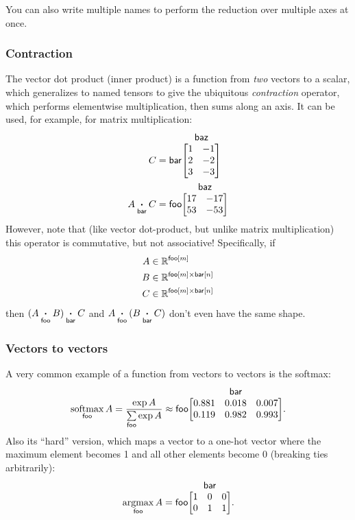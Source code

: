 \documentclass{article}
\makeatletter
\newcommand{\nmatrix}[3]{\name{#1}\begin{array}[b]{@{}c@{}}\name{#2}\\\begin{bmatrix}#3\end{bmatrix}\end{array}}
\makeatother
\begin{document}
You can also write multiple names to perform the reduction over multiple axes at once.

\subsubsection{Contraction}

The vector dot product (inner product) is a function from \emph{two} vectors to a scalar, which generalizes to named tensors to give the ubiquitous \emph{contraction} operator, which performs elementwise multiplication, then sums along an axis. It can be used, for example, for matrix multiplication:
\begin{align*}
C &= \nmatrix{bar}{baz}{
  1 & -1 \\ 2 & -2 \\ 3 & -3
} \\
A \ndot{bar} C &= \nmatrix{foo}{baz}{
  17 & -17 \\
  53 & -53
}
\end{align*}
However, note that (like vector dot-product, but unlike matrix multiplication) this operator is commutative, but not associative! Specifically, if
\begin{align*}
A &\in \mathbb{R}^{\mathsf{foo}[m]} \\
B &\in \mathbb{R}^{\mathsf{foo}[m] \times\mathsf{bar}[n]} \\
C &\in \mathbb{R}^{\mathsf{foo}[m] \times\mathsf{bar}[n]}
\end{align*}
then $(A \mathbin{\mathop{\boldsymbol\cdot}\limits_{\mathsf{foo}}} B) \mathbin{\mathop{\boldsymbol\cdot}\limits_{\mathsf{bar}}} C$ and $A \mathbin{\mathop{\boldsymbol\cdot}\limits_{\mathsf{foo}}} (B \mathbin{\mathop{\boldsymbol\cdot}\limits_{\mathsf{bar}}} C)$ don't even have the same shape.

\subsubsection{Vectors to vectors}

A very common example of a function from vectors to vectors is the softmax:
\begin{equation*}
  \nfun{foo}{softmax} A = \frac{\exp A}{\nsum{foo} \exp A} \approx \nmatrix{foo}{bar}{
    0.881 & 0.018 & 0.007 \\
    0.119 & 0.982 & 0.993
  }.
\end{equation*}
Also its ``hard'' version, which maps a vector to a one-hot vector where the maximum element becomes 1 and all other elements become 0 (breaking ties arbitrarily):
\begin{equation*}
  \nfun{foo}{argmax} A = \nmatrix{foo}{bar}{
    1 & 0 & 0 \\
    0 & 1 & 1
  }.
\end{equation*}
\end{document}
